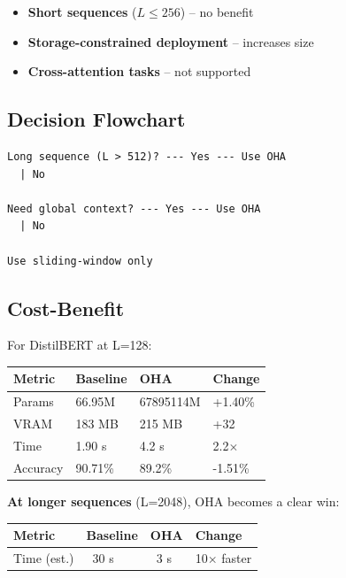 \begin{itemize}
\item \textbf{Short sequences} ($L \leq 256$) -- no benefit
\item \textbf{Storage-constrained deployment} -- increases size
\item \textbf{Cross-attention tasks} -- not supported

\end{itemize}
\subsection{Decision Flowchart}

\begin{lstlisting}
Long sequence (L > 512)? --- Yes --- Use OHA
  | No
   
Need global context? --- Yes --- Use OHA
  | No
   
Use sliding-window only
\end{lstlisting}

\subsection{Cost-Benefit}

For DistilBERT at L=128:

\begin{table}[H]
\centering
\small
\begin{tabular}{llll}
\toprule
\textbf{Metric} & \textbf{Baseline} & \textbf{OHA} & \textbf{Change} \\
\midrule
Params & 66.95M & 67895114M & +1.40\% \\
VRAM & 183 MB & 215 MB & +32 \\
Time & 1.90 s & 4.2 s & 2.2$\times$ \\
Accuracy & 90.71\% & 89.2\% & -1.51\% \\
\bottomrule
\end{tabular}
\end{table}

\textbf{At longer sequences} (L=2048), OHA becomes a clear win:

\begin{table}[H]
\centering
\small
\begin{tabular}{llll}
\toprule
\textbf{Metric} & \textbf{Baseline} & \textbf{OHA} & \textbf{Change} \\
\midrule
Time (est.) & ~30 s & ~3 s & 10$\times$ faster \\
\bottomrule
\end{tabular}
\end{table}

